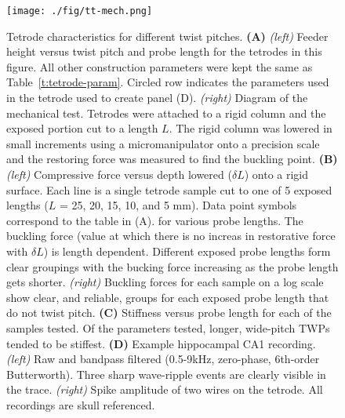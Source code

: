 \documentclass[11pt,a4paper]{article}
\begin{document}
\begin{table}[!htbp]
\begin{tabular}{rlP{3cm}P{3cm}}
\bottomrule
\end{tabular}
\end{table}

\begin{figure}
\centering
\texttt{[image: ./fig/tt-mech.png]}
\caption{Tetrode characteristics for different twist pitches.
    \textbf{(A)} \textit{(left)} Feeder height versus twist pitch and probe
    length for the tetrodes in this figure. All other construction parameters
    were kept the same as Table~\ref{t:tetrode-param}. Circled row indicates
    the parameters used in the tetrode used to create panel (D).
    \textit{(right)} Diagram of the mechanical test. Tetrodes were attached to a rigid column
    and the exposed portion cut to a length $L$. The rigid column was lowered
    in small increments using a micromanipulator onto a precision scale and the
    restoring force was measured to find the buckling point.
    \textbf{(B)} \textit{(left)} Compressive force versus depth lowered
    ($\delta L$) onto a rigid surface.  Each line is a single tetrode sample
    cut to one of 5 exposed lengths ($L$ = 25, 20, 15, 10, and 5 mm). Data
    point symbols correspond to the table in (A).  for various probe lengths.
    The buckling force (value at which there is no increas in restorative force
    with $\delta L$) is length dependent. Different exposed probe lengths form
    clear groupings with the bucking force increasing as the probe length gets
    shorter. \textit{(right)} Buckling forces for each sample on a log scale
    show clear, and reliable, groups for each exposed probe length that do not
    twist pitch.
    \textbf{(C)} Stiffness versus probe length for each of the samples tested.
    Of the parameters tested, longer, wide-pitch TWPs tended to be stiffest.
    \textbf{(D)} Example hippocampal CA1 recording. \textit{(left)} Raw and
    bandpass filtered (0.5-9kHz, zero-phase, 6th-order Butterworth). Three
    sharp wave-ripple events are clearly visible in the trace. \textit{(right)}
    Spike amplitude of two wires on the tetrode. All recordings are skull
    referenced.
}
\label{f:trode-char}
\end{figure}
\end{document}
